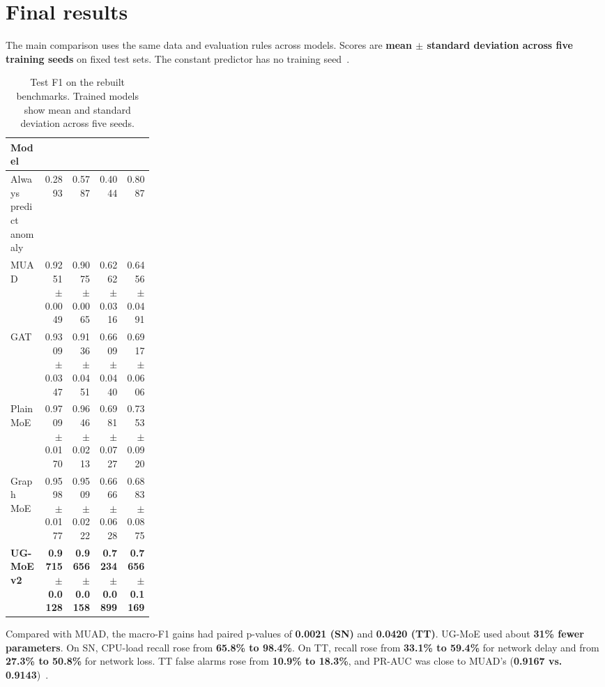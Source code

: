 \documentclass[11pt,a4paper,onecolumn]{IEEEtran}
\begin{document}
\section{Final results}

The main comparison uses the same data and evaluation rules across models. Scores are \textbf{mean
\ensuremath{\pm} standard deviation across five training seeds} on fixed test sets. The constant predictor
has no training seed~\cite{experiment-results}.

\begin{table}[H]
\centering
\small
\setlength{\tabcolsep}{4pt}
\renewcommand{\arraystretch}{1.18}
\caption{Test F1 on the rebuilt benchmarks. Trained models show mean and standard deviation across five seeds.}
\begin{tabular}{@{}P{0.24\linewidth}rrrr@{}}
\toprule
\textbf{Model} & \textbf{} & \textbf{} & \textbf{} & \textbf{} \\
\midrule
Always predict anomaly &
  0.2893 &
  0.5787 &
  0.4044 &
  0.8087 \\
MUAD &
  0.9251 \ensuremath{\pm} 0.0049 &
  0.9075 \ensuremath{\pm} 0.0065 &
  0.6262 \ensuremath{\pm} 0.0316 &
  0.6456 \ensuremath{\pm} 0.0491 \\
GAT &
  0.9309 \ensuremath{\pm} 0.0347 &
  0.9136 \ensuremath{\pm} 0.0451 &
  0.6609 \ensuremath{\pm} 0.0440 &
  0.6917 \ensuremath{\pm} 0.0606 \\
Plain MoE &
  0.9709 \ensuremath{\pm} 0.0170 &
  0.9646 \ensuremath{\pm} 0.0213 &
  0.6981 \ensuremath{\pm} 0.0727 &
  0.7353 \ensuremath{\pm} 0.0920 \\
Graph MoE &
  0.9598 \ensuremath{\pm} 0.0177 &
  0.9509 \ensuremath{\pm} 0.0222 &
  0.6666 \ensuremath{\pm} 0.0628 &
  0.6883 \ensuremath{\pm} 0.0875 \\
\textbf{UG-MoE v2} &
  \textbf{0.9715 \ensuremath{\pm} 0.0128} &
  \textbf{0.9656 \ensuremath{\pm} 0.0158} &
  \textbf{0.7234 \ensuremath{\pm} 0.0899} &
  \textbf{0.7656 \ensuremath{\pm} 0.1169} \\
\bottomrule
\end{tabular}
\end{table}

Compared with MUAD, the macro-F1 gains had paired p-values of \textbf{0.0021 (SN)} and \textbf{0.0420 (TT)}.
UG-MoE used about \textbf{31\% fewer parameters}. On SN, CPU-load recall rose from \textbf{65.8\% to
98.4\%}. On TT, recall rose from \textbf{33.1\% to 59.4\%} for network delay and from \textbf{27.3\% to
50.8\%} for network loss. TT false alarms rose from \textbf{10.9\% to 18.3\%}, and PR-AUC was close to
MUAD's (\textbf{0.9167 vs. 0.9143})~\cite{experiment-results}.
\end{document}
